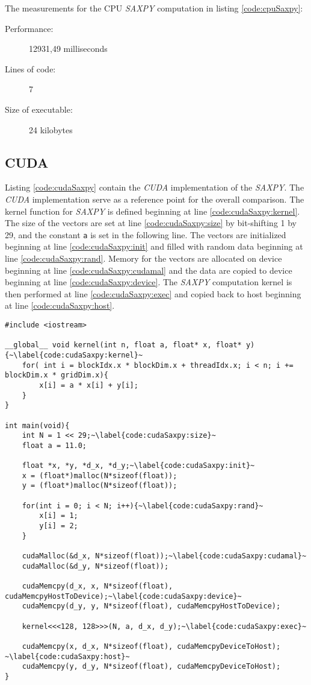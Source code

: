 The measurements for the CPU \textit{SAXPY} computation in listing \ref{code:cpuSaxpy}:
\begin{description}
    \item[Performance:] 12931,49 milliseconds
    \item[Lines of code:] 7 
    \item[Size of executable:] 24 kilobytes
\end{description}

\subsection{CUDA}
Listing \ref{code:cudaSaxpy} contain the \textit{CUDA} implementation of the \textit{SAXPY}. The \textit{CUDA} implementation serve as a reference point for the overall comparison. The kernel function for \textit{SAXPY} is defined beginning at line \ref{code:cudaSaxpy:kernel}. The size of the vectors are set at line \ref{code:cudaSaxpy:size} by bit-shifting 1 by 29, and the constant \texttt{a} is set in the following line. The vectors are initialized beginning at line \ref{code:cudaSaxpy:init} and filled with random data beginning at line \ref{code:cudaSaxpy:rand}. Memory for the vectors are allocated on device beginning at line \ref{code:cudaSaxpy:cudamal} and the data are copied to device beginning at line \ref{code:cudaSaxpy:device}. The \textit{SAXPY} computation kernel is then performed at line \ref{code:cudaSaxpy:exec} and copied back to host beginning at line \ref{code:cudaSaxpy:host}.

\begin{lstlisting}[caption={\textit{CUDA} \textit{SAXPY} Implementation.}, label={code:cudaSaxpy}]
#include <iostream>

__global__ void kernel(int n, float a, float* x, float* y){~\label{code:cudaSaxpy:kernel}~
    for( int i = blockIdx.x * blockDim.x + threadIdx.x; i < n; i += blockDim.x * gridDim.x){
        x[i] = a * x[i] + y[i];
    }
}

int main(void){
    int N = 1 << 29;~\label{code:cudaSaxpy:size}~
    float a = 11.0;

    float *x, *y, *d_x, *d_y;~\label{code:cudaSaxpy:init}~
    x = (float*)malloc(N*sizeof(float));
    y = (float*)malloc(N*sizeof(float));

    for(int i = 0; i < N; i++){~\label{code:cudaSaxpy:rand}~
        x[i] = 1;
        y[i] = 2;
    }

    cudaMalloc(&d_x, N*sizeof(float));~\label{code:cudaSaxpy:cudamal}~
    cudaMalloc(&d_y, N*sizeof(float));

    cudaMemcpy(d_x, x, N*sizeof(float), cudaMemcpyHostToDevice);~\label{code:cudaSaxpy:device}~
    cudaMemcpy(d_y, y, N*sizeof(float), cudaMemcpyHostToDevice);

    kernel<<<128, 128>>>(N, a, d_x, d_y);~\label{code:cudaSaxpy:exec}~

    cudaMemcpy(x, d_x, N*sizeof(float), cudaMemcpyDeviceToHost); ~\label{code:cudaSaxpy:host}~
    cudaMemcpy(y, d_y, N*sizeof(float), cudaMemcpyDeviceToHost);
}
\end{lstlisting}

